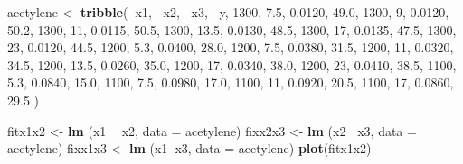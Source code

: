 \documentclass[
]{article}
\newenvironment{Shaded}{\begin{snugshade}}{\end{snugshade}}
\newcommand{\DataTypeTok}[1]{\textcolor[rgb]{0.13,0.29,0.53}{#1}}
\newcommand{\DecValTok}[1]{\textcolor[rgb]{0.00,0.00,0.81}{#1}}
\newcommand{\FloatTok}[1]{\textcolor[rgb]{0.00,0.00,0.81}{#1}}
\newcommand{\KeywordTok}[1]{\textcolor[rgb]{0.13,0.29,0.53}{\textbf{#1}}}
\newcommand{\NormalTok}[1]{#1}
\newcommand{\OperatorTok}[1]{\textcolor[rgb]{0.81,0.36,0.00}{\textbf{#1}}}
\newcommand{\StringTok}[1]{\textcolor[rgb]{0.31,0.60,0.02}{#1}}
\begin{document}
\begin{Shaded}
\begin{Highlighting}[]
\NormalTok{acetylene <-}\StringTok{ }
\StringTok{  }\KeywordTok{tribble}\NormalTok{(}\OperatorTok{~}\NormalTok{x1,  }\OperatorTok{~}\NormalTok{x2,   }\OperatorTok{~}\NormalTok{x3,   }\OperatorTok{~}\NormalTok{y,}
           \DecValTok{1300}\NormalTok{, }\FloatTok{7.5}\NormalTok{,  }\FloatTok{0.0120}\NormalTok{, }\FloatTok{49.0}\NormalTok{,}
           \DecValTok{1300}\NormalTok{, }\DecValTok{9}\NormalTok{,    }\FloatTok{0.0120}\NormalTok{, }\FloatTok{50.2}\NormalTok{,}
           \DecValTok{1300}\NormalTok{, }\DecValTok{11}\NormalTok{,   }\FloatTok{0.0115}\NormalTok{, }\FloatTok{50.5}\NormalTok{,}
           \DecValTok{1300}\NormalTok{, }\FloatTok{13.5}\NormalTok{, }\FloatTok{0.0130}\NormalTok{, }\FloatTok{48.5}\NormalTok{,}
           \DecValTok{1300}\NormalTok{, }\DecValTok{17}\NormalTok{,   }\FloatTok{0.0135}\NormalTok{, }\FloatTok{47.5}\NormalTok{,}
           \DecValTok{1300}\NormalTok{, }\DecValTok{23}\NormalTok{,   }\FloatTok{0.0120}\NormalTok{, }\FloatTok{44.5}\NormalTok{,}
           \DecValTok{1200}\NormalTok{, }\FloatTok{5.3}\NormalTok{,  }\FloatTok{0.0400}\NormalTok{, }\FloatTok{28.0}\NormalTok{,}
           \DecValTok{1200}\NormalTok{, }\FloatTok{7.5}\NormalTok{,  }\FloatTok{0.0380}\NormalTok{, }\FloatTok{31.5}\NormalTok{,}
           \DecValTok{1200}\NormalTok{, }\DecValTok{11}\NormalTok{,   }\FloatTok{0.0320}\NormalTok{, }\FloatTok{34.5}\NormalTok{,}
           \DecValTok{1200}\NormalTok{, }\FloatTok{13.5}\NormalTok{, }\FloatTok{0.0260}\NormalTok{, }\FloatTok{35.0}\NormalTok{,}
           \DecValTok{1200}\NormalTok{, }\DecValTok{17}\NormalTok{,   }\FloatTok{0.0340}\NormalTok{, }\FloatTok{38.0}\NormalTok{,}
           \DecValTok{1200}\NormalTok{, }\DecValTok{23}\NormalTok{,   }\FloatTok{0.0410}\NormalTok{, }\FloatTok{38.5}\NormalTok{,}
           \DecValTok{1100}\NormalTok{, }\FloatTok{5.3}\NormalTok{,  }\FloatTok{0.0840}\NormalTok{, }\FloatTok{15.0}\NormalTok{,}
           \DecValTok{1100}\NormalTok{, }\FloatTok{7.5}\NormalTok{,  }\FloatTok{0.0980}\NormalTok{, }\FloatTok{17.0}\NormalTok{,}
           \DecValTok{1100}\NormalTok{, }\DecValTok{11}\NormalTok{,   }\FloatTok{0.0920}\NormalTok{, }\FloatTok{20.5}\NormalTok{,}
           \DecValTok{1100}\NormalTok{, }\DecValTok{17}\NormalTok{,   }\FloatTok{0.0860}\NormalTok{, }\FloatTok{29.5}
\NormalTok{           )}

\NormalTok{fitx1x2 <-}\StringTok{ }\KeywordTok{lm}\NormalTok{ (x1 }\OperatorTok{~}\StringTok{ }\NormalTok{x2, }\DataTypeTok{data =}\NormalTok{ acetylene)}
\NormalTok{fixx2x3 <-}\StringTok{ }\KeywordTok{lm}\NormalTok{ (x2 }\OperatorTok{~}\NormalTok{x3, }\DataTypeTok{data =}\NormalTok{ acetylene)}
\NormalTok{fixx1x3 <-}\StringTok{ }\KeywordTok{lm}\NormalTok{ (x1}\OperatorTok{~}\NormalTok{x3, }\DataTypeTok{data =}\NormalTok{ acetylene)}
\KeywordTok{plot}\NormalTok{(fitx1x2)}
\end{Highlighting}
\end{Shaded}
\end{document}
